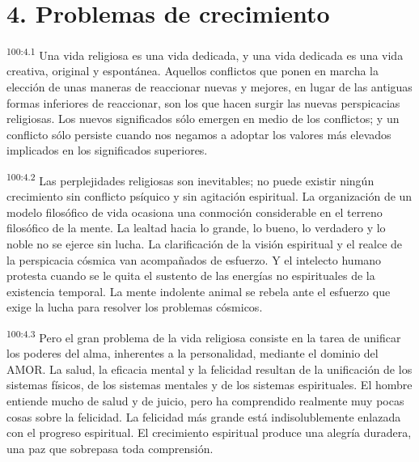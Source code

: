 \documentclass[twoside, 11pt]{book}
\begin{document}
\section*{4. Problemas de crecimiento}
\par
\textsuperscript{100:4.1} Una vida religiosa es una vida dedicada, y una vida dedicada es una vida creativa, original y espontánea. Aquellos conflictos que ponen en marcha la elección de unas maneras de reaccionar nuevas y mejores, en lugar de las antiguas formas inferiores de reaccionar, son los que hacen surgir las nuevas perspicacias religiosas. Los nuevos significados sólo emergen en medio de los conflictos; y un conflicto sólo persiste cuando nos negamos a adoptar los valores más elevados implicados en los significados superiores.

\par
\textsuperscript{100:4.2} Las perplejidades religiosas son inevitables; no puede existir ningún crecimiento sin conflicto psíquico y sin agitación espiritual. La organización de un modelo filosófico de vida ocasiona una conmoción considerable en el terreno filosófico de la mente. La lealtad hacia lo grande, lo bueno, lo verdadero y lo noble no se ejerce sin lucha. La clarificación de la visión espiritual y el realce de la perspicacia cósmica van acompañados de esfuerzo. Y el intelecto humano protesta cuando se le quita el sustento de las energías no espirituales de la existencia temporal. La mente indolente animal se rebela ante el esfuerzo que exige la lucha para resolver los problemas cósmicos.

\par
\textsuperscript{100:4.3} Pero el gran problema de la vida religiosa consiste en la tarea de unificar los poderes del alma, inherentes a la personalidad, mediante el dominio del AMOR. La salud, la eficacia mental y la felicidad resultan de la unificación de los sistemas físicos, de los sistemas mentales y de los sistemas espirituales. El hombre entiende mucho de salud y de juicio, pero ha comprendido realmente muy pocas cosas sobre la felicidad. La felicidad más grande está indisolublemente enlazada con el progreso espiritual. El crecimiento espiritual produce una alegría duradera, una paz que sobrepasa toda comprensión.
\end{document}
